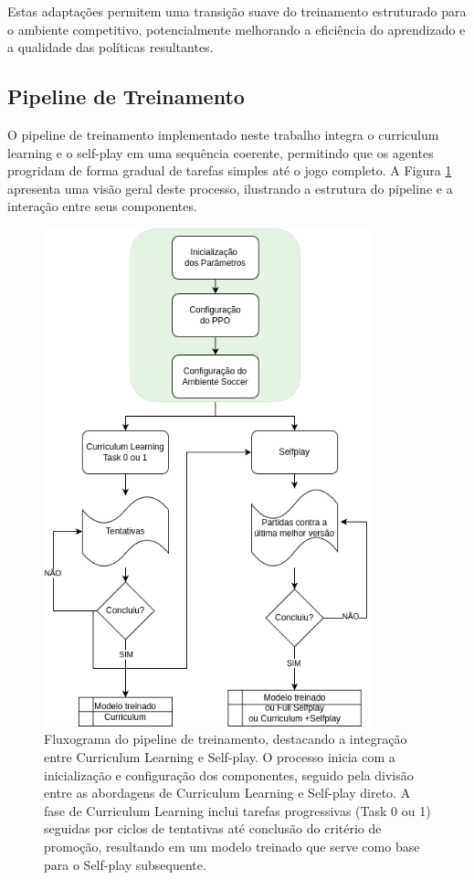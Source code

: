 Estas adaptações permitem uma transição suave do treinamento estruturado para o ambiente competitivo, potencialmente melhorando a eficiência do aprendizado e a qualidade das políticas resultantes.

\subsection{Pipeline de Treinamento}

O pipeline de treinamento implementado neste trabalho integra o curriculum learning e o self-play em uma sequência coerente, permitindo que os agentes progridam de forma gradual de tarefas simples até o jogo completo. A Figura \ref{fig:fluxograma_treino} apresenta uma visão geral deste processo, ilustrando a estrutura do pipeline e a interação entre seus componentes.

\begin{figure}[H]
    \centering
    \includegraphics[width=0.85\textwidth]{fig/fluxograma_treino_mestrado.png}
    \caption{Fluxograma do pipeline de treinamento, destacando a integração entre Curriculum Learning e Self-play. O processo inicia com a inicialização e configuração dos componentes, seguido pela divisão entre as abordagens de Curriculum Learning e Self-play direto. A fase de Curriculum Learning inclui tarefas progressivas (Task 0 ou 1) seguidas por ciclos de tentativas até conclusão do critério de promoção, resultando em um modelo treinado que serve como base para o Self-play subsequente.}
    \label{fig:fluxograma_treino}
\end{figure}

